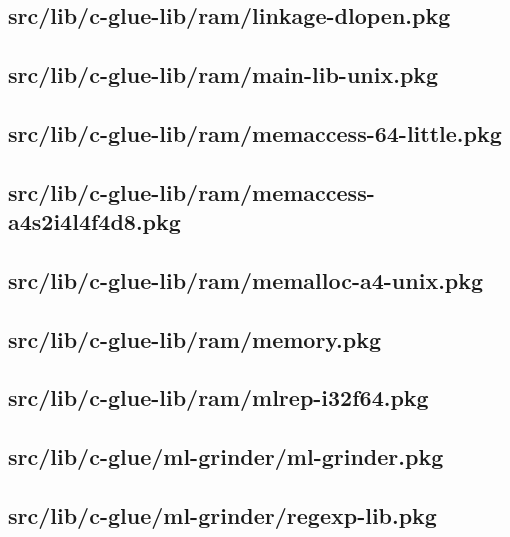 \subsection{src/lib/c-glue-lib/ram/linkage-dlopen.pkg}


\subsection{src/lib/c-glue-lib/ram/main-lib-unix.pkg}


\subsection{src/lib/c-glue-lib/ram/memaccess-64-little.pkg}


\subsection{src/lib/c-glue-lib/ram/memaccess-a4s2i4l4f4d8.pkg}


\subsection{src/lib/c-glue-lib/ram/memalloc-a4-unix.pkg}


\subsection{src/lib/c-glue-lib/ram/memory.pkg}


\subsection{src/lib/c-glue-lib/ram/mlrep-i32f64.pkg}


\subsection{src/lib/c-glue/ml-grinder/ml-grinder.pkg}


\subsection{src/lib/c-glue/ml-grinder/regexp-lib.pkg}


